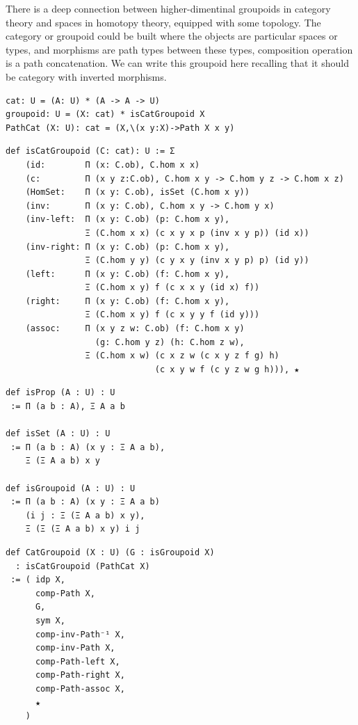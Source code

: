 \documentclass{article}
\begin{document}
There is a deep connection between higher-dimentinal groupoids in category theory and
spaces in homotopy theory, equipped with some topology. The category or groupoid could
be built where the objects are particular spaces or types, and morphisms are path types
between these types, composition operation is a path concatenation. We can write this
groupoid here recalling that it should be category with inverted morphisms.

\begin{lstlisting}
cat: U = (A: U) * (A -> A -> U)
groupoid: U = (X: cat) * isCatGroupoid X
PathCat (X: U): cat = (X,\(x y:X)->Path X x y)
\end{lstlisting}

\begin{lstlisting}
def isCatGroupoid (C: cat): U := Σ
    (id:        Π (x: C.ob), C.hom x x)
    (c:         Π (x y z:C.ob), C.hom x y -> C.hom y z -> C.hom x z)
    (HomSet:    Π (x y: C.ob), isSet (C.hom x y))
    (inv:       Π (x y: C.ob), C.hom x y -> C.hom y x)
    (inv-left:  Π (x y: C.ob) (p: C.hom x y),
                Ξ (C.hom x x) (c x y x p (inv x y p)) (id x))
    (inv-right: Π (x y: C.ob) (p: C.hom x y),
                Ξ (C.hom y y) (c y x y (inv x y p) p) (id y))
    (left:      Π (x y: C.ob) (f: C.hom x y),
                Ξ (C.hom x y) f (c x x y (id x) f))
    (right:     Π (x y: C.ob) (f: C.hom x y),
                Ξ (C.hom x y) f (c x y y f (id y)))
    (assoc:     Π (x y z w: C.ob) (f: C.hom x y)
                  (g: C.hom y z) (h: C.hom z w),
                Ξ (C.hom x w) (c x z w (c x y z f g) h)
                              (c x y w f (c y z w g h))), ★
\end{lstlisting}

\newpage
\begin{lstlisting}
def isProp (A : U) : U
 := Π (a b : A), Ξ A a b

def isSet (A : U) : U
 := Π (a b : A) (x y : Ξ A a b),
    Ξ (Ξ A a b) x y

def isGroupoid (A : U) : U
 := Π (a b : A) (x y : Ξ A a b)
    (i j : Ξ (Ξ A a b) x y),
    Ξ (Ξ (Ξ A a b) x y) i j
\end{lstlisting}

\begin{lstlisting}
def CatGroupoid (X : U) (G : isGroupoid X)
  : isCatGroupoid (PathCat X)
 := ( idp X,
      comp-Path X,
      G,
      sym X,
      comp-inv-Path⁻¹ X,
      comp-inv-Path X,
      comp-Path-left X,
      comp-Path-right X,
      comp-Path-assoc X,
      ★
    )
\end{lstlisting}
\end{document}
